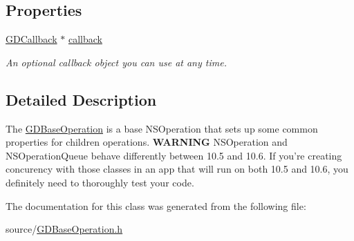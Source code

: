 \subsection*{Properties}
\begin{DoxyCompactItemize}
\item 
\hypertarget{interface_g_d_base_operation_ad5c65bc7e08b40bfbccff9da18b70876}{
\hyperlink{interface_g_d_callback}{GDCallback} $\ast$ \hyperlink{interface_g_d_base_operation_ad5c65bc7e08b40bfbccff9da18b70876}{callback}}
\label{interface_g_d_base_operation_ad5c65bc7e08b40bfbccff9da18b70876}

\begin{DoxyCompactList}\small\item\em An optional callback object you can use at any time. \item\end{DoxyCompactList}\end{DoxyCompactItemize}


\subsection{Detailed Description}
The \hyperlink{interface_g_d_base_operation}{GDBaseOperation} is a base NSOperation that sets up some common properties for children operations. {\bfseries WARNING} NSOperation and NSOperationQueue behave differently between 10.5 and 10.6. If you're creating concurency with those classes in an app that will run on both 10.5 and 10.6, you definitely need to thoroughly test your code. 

The documentation for this class was generated from the following file:\begin{DoxyCompactItemize}
\item 
source/\hyperlink{_g_d_base_operation_8h}{GDBaseOperation.h}\end{DoxyCompactItemize}
